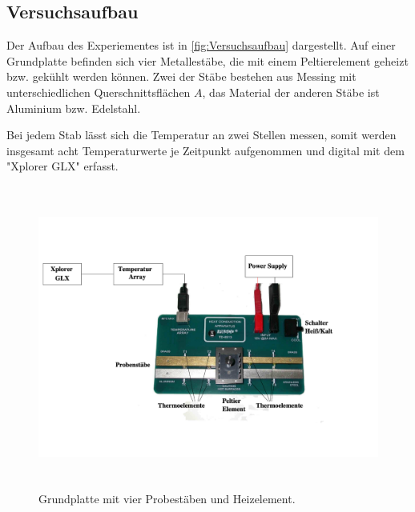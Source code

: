 \subsection{Versuchsaufbau}
\label{sec:Versuchsaufbau}

Der Aufbau des Experiementes ist in \autoref{fig:Versuchsaufbau} dargestellt.
Auf einer Grundplatte befinden sich vier Metallestäbe, die mit einem Peltierelement geheizt bzw. gekühlt werden können.
Zwei der Stäbe bestehen aus Messing mit unterschiedlichen Querschnittsflächen $A$, das Material der anderen Stäbe ist
Aluminium bzw. Edelstahl.

Bei jedem Stab lässt sich die Temperatur an zwei Stellen messen, somit werden insgesamt acht Temperaturwerte je
Zeitpunkt aufgenommen und digital mit dem "Xplorer GLX" erfasst.

\begin{figure} [H]
    \centering
    \includegraphics[height=10cm]{content/Abbildungen/Versuchsaufbau.pdf}
    \caption{Grundplatte mit vier Probestäben und Heizelement.\cite{v204}}
    \label{fig:Versuchsaufbau}
\end{figure}